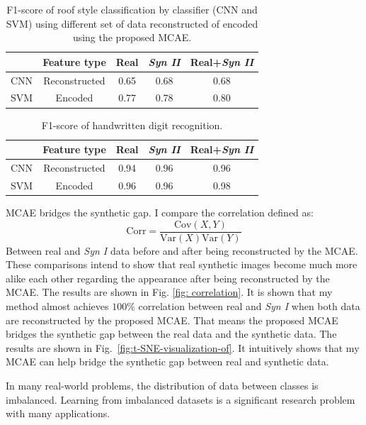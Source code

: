 \documentclass{iitthesis}
\begin{document}
\begin{table}[h]
\protect\caption{F1-score of roof style classification by classifier (CNN and SVM)
using different set of data reconstructed of encoded using the proposed
MCAE.}
\centering %
\begin{tabular}{lcccc}
\hline \hline
 & Feature type  & Real  & \textit{Syn II}  & Real+\textit{Syn II} \tabularnewline
\midrule 
CNN & Reconstructed  & 0.65  & 0.68  & 0.68 \tabularnewline
SVM & Encoded  & 0.77  & 0.78  & 0.80 \tabularnewline
\hline
\end{tabular}
\label{Tab: RoofBetterData} 
\end{table}

\begin{table}[h]
\protect\caption{F1-score of handwritten digit recognition.}
\centering %
\begin{tabular}{@{}lcccc@{}}
\hline \hline
 & Feature type  & Real  & \textit{Syn II}  & Real+\textit{Syn II} \tabularnewline
\hline 
CNN  & Reconstructed  & 0.94  & 0.96  & 0.96 \tabularnewline
SVM  & Encoded  & 0.96  & 0.96  & 0.98 \tabularnewline
\hline
\end{tabular}
\label{Tab: DigitBetterData} 
\end{table}

MCAE bridges the synthetic gap. I compare the correlation
defined as: 
\begin{equation}
\text{Corr}=\frac{\text{Cov}(X,Y)}{\text{Var}(X)\text{Var}(Y)}
\end{equation}
Between real and \textit{Syn I} data before and after being reconstructed by the MCAE. These comparisons intend to show that real synthetic images become much more alike each other regarding the
appearance after being reconstructed by the MCAE. The results are shown in Fig. \ref{fig: correlation}. It is shown that my method almost achieves $100\%$ correlation between real and \textit{Syn I} when both data are reconstructed by the proposed MCAE. That means the proposed MCAE bridges the synthetic gap between the real data
and the synthetic data. The results are shown in Fig.~\ref{fig:t-SNE-visualization-of}. It intuitively shows that my MCAE can help bridge the synthetic gap between real and synthetic data.

\clearpage

 \label{chapter: feature space}


In many real-world problems, the distribution of data between classes is imbalanced. Learning from imbalanced datasets is a significant research problem with many applications.
\end{document}

